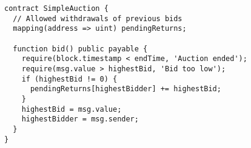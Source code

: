 \begin{lstlisting}[language=Solidity]
contract SimpleAuction {
  // Allowed withdrawals of previous bids
  mapping(address => uint) pendingReturns;
  
  function bid() public payable {
    require(block.timestamp < endTime, 'Auction ended');
    require(msg.value > highestBid, 'Bid too low');
    if (highestBid != 0) {
      pendingReturns[highestBidder] += highestBid;
    }
    highestBid = msg.value;
    highestBidder = msg.sender;
  }
}

\end{lstlisting}